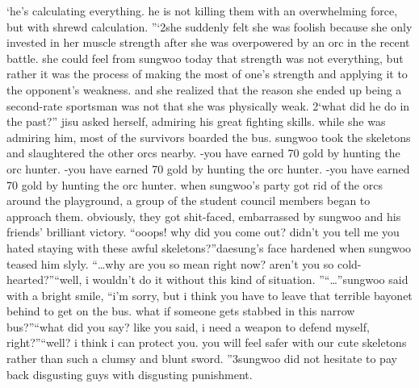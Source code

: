 ‘he’s calculating everything.
 he is not killing them with an overwhelming force, but with shrewd calculation.
”‘2she suddenly felt she was foolish because she only invested in her muscle strength after she was overpowered by an orc in the recent battle.
she could feel from sungwoo today that strength was not everything, but rather it was the process of making the most of one’s strength and applying it to the opponent’s weakness.
 and she realized that the reason she ended up being a second-rate sportsman was not that she was physically weak.
2‘what did he do in the past?” jisu asked herself, admiring his great fighting skills.
while she was admiring him, most of the survivors boarded the bus.
 sungwoo took the skeletons and slaughtered the other orcs nearby.
-you have earned 70 gold by hunting the orc hunter.
-you have earned 70 gold by hunting the orc hunter.
-you have earned 70 gold by hunting the orc hunter.
when sungwoo’s party got rid of the orcs around the playground, a group of the student council members began to approach them.
 obviously, they got shit-faced, embarrassed by sungwoo and his friends’ brilliant victory.
“ooops! why did you come out? didn’t you tell me you hated staying with these awful skeletons?”daesung’s face hardened when sungwoo teased him slyly.
“…why are you so mean right now? aren’t you so cold-hearted?”“well, i wouldn’t do it without this kind of situation.
”“…”sungwoo said with a bright smile, “i’m sorry, but i think you have to leave that terrible bayonet behind to get on the bus.
 what if someone gets stabbed in this narrow bus?”“what did you say? like you said, i need a weapon to defend myself, right?”“well? i think i can protect you.
 you will feel safer with our cute skeletons rather than such a clumsy and blunt sword.
”3sungwoo did not hesitate to pay back disgusting guys with disgusting punishment.


